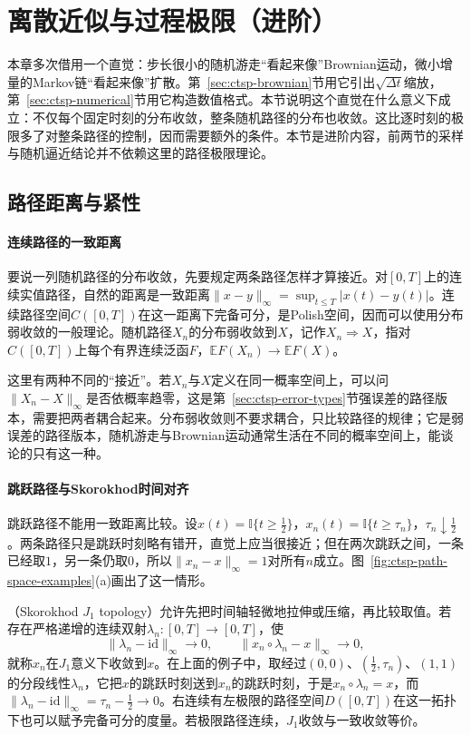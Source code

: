 \section{离散近似与过程极限（进阶）}
\label{sec:ctsp-process-limits}

本章多次借用一个直觉：步长很小的随机游走“看起来像”Brownian运动，微小增量的Markov链“看起来像”扩散。第~\ref{sec:ctsp-brownian}节用它引出$\sqrt{\Delta t}$缩放，第~\ref{sec:ctsp-numerical}节用它构造数值格式。本节说明这个直觉在什么意义下成立：不仅每个固定时刻的分布收敛，整条随机路径的分布也收敛。这比逐时刻的极限多了对整条路径的控制，因而需要额外的条件。本节是进阶内容，前两节的采样与随机逼近结论并不依赖这里的路径极限理论。

\subsection{路径距离与紧性}
\label{sec:ctsp-path-space}

\paragraph{连续路径的一致距离}
要说一列随机路径的分布收敛，先要规定两条路径怎样才算接近。对$[0,T]$上的连续实值路径，自然的距离是一致距离$\|x-y\|_\infty=\sup_{t\leq T}|x(t)-y(t)|$。连续路径空间$C([0,T])$在这一距离下完备可分，是Polish空间，因而可以使用分布弱收敛的一般理论。随机路径$X_n$的分布弱收敛到$X$，记作$X_n\Rightarrow X$，指对$C([0,T])$上每个有界连续泛函$F$，$\mathbb EF(X_n)\to\mathbb EF(X)$。

这里有两种不同的“接近”。若$X_n$与$X$定义在同一概率空间上，可以问$\|X_n-X\|_\infty$是否依概率趋零，这是第~\ref{sec:ctsp-error-types}节强误差的路径版本，需要把两者耦合起来。分布弱收敛则不要求耦合，只比较路径的规律；它是弱误差的路径版本，随机游走与Brownian运动通常生活在不同的概率空间上，能谈论的只有这一种。

\paragraph{跳跃路径与Skorokhod时间对齐}
跳跃路径不能用一致距离比较。设$x(t)=\mathbb I\{t\geq\frac12\}$，$x_n(t)=\mathbb I\{t\geq\tau_n\}$，$\tau_n\downarrow\frac12$。两条路径只是跳跃时刻略有错开，直觉上应当很接近；但在两次跳跃之间，一条已经取$1$，另一条仍取$0$，所以$\|x_n-x\|_\infty=1$对所有$n$成立。图~\ref{fig:ctsp-path-space-examples}(a)画出了这一情形。

（Skorokhod $J_1$ topology）允许先把时间轴轻微地拉伸或压缩，再比较取值。若存在严格递增的连续双射$\lambda_n:[0,T]\to[0,T]$，使
\[
  \|\lambda_n-\mathrm{id}\|_\infty\to0,\qquad\|x_n\circ\lambda_n-x\|_\infty\to0 ,
\]
就称$x_n$在$J_1$意义下收敛到$x$。在上面的例子中，取经过$(0,0)$、$(\frac12,\tau_n)$、$(1,1)$的分段线性$\lambda_n$，它把$x$的跳跃时刻送到$x_n$的跳跃时刻，于是$x_n\circ\lambda_n=x$，而$\|\lambda_n-\mathrm{id}\|_\infty=\tau_n-\frac12\to0$。右连续有左极限的路径空间$D([0,T])$在这一拓扑下也可以赋予完备可分的度量。若极限路径连续，$J_1$收敛与一致收敛等价。

